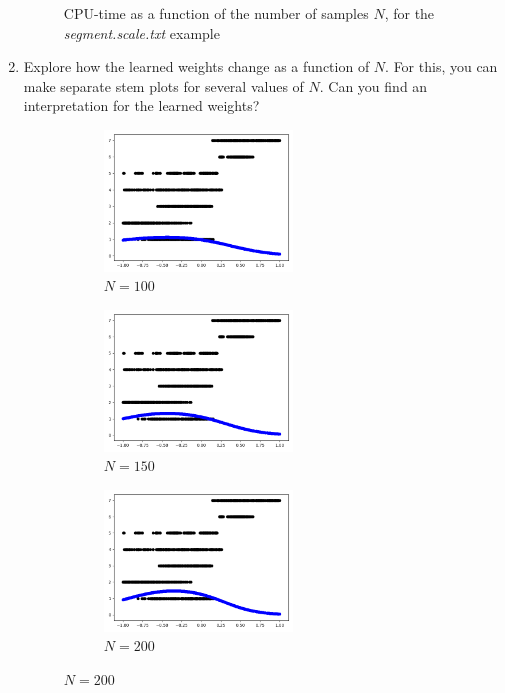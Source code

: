 \documentclass[12pt,letterpaper]{article}
\begin{document}
\begin{enumerate}[leftmargin=!,labelindent=5pt]
\begin{figure}[H]
            \caption{CPU-time as a function of the number of samples $N$, for the \textit{segment.scale.txt} example}
            \label{fig:1}
        \end{figure}
    \newpage
    \item Explore how the learned weights change as a function of $N$. For this, you can make separate stem plots for several values of $N$. Can you find an interpretation for the learned weights?
    \begin{figure}[H]
        \begin{subfigure}{0.3\textwidth}
        \includegraphics[width=5cm]{images/log100.jpg} 
        \caption{$N = 100$}
        \label{fig:subim4}
        \end{subfigure}
        \begin{subfigure}{0.3\textwidth}
        \includegraphics[width=5cm]{images/log150.jpg}
        \caption{$N = 150$}
        \label{fig:subim5}
        \end{subfigure}
        \begin{subfigure}{0.3\textwidth}
        \includegraphics[width=5cm]{images/log200.jpg}
        \caption{$N = 200$}
        \label{fig:subim6}
        \end{subfigure}
        

\end{figure}
\end{enumerate}
\end{document}
